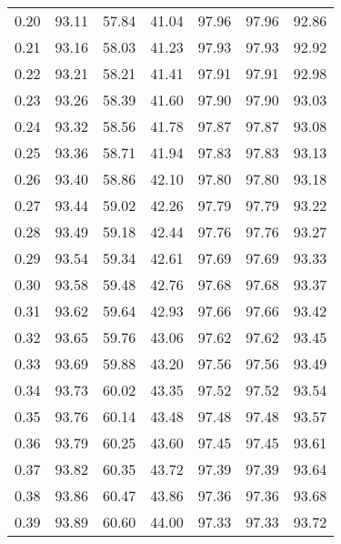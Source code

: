 \begin{tabular}{|c|c|c|c|c|c|c|}
      0.20 &     93.11 &     57.84 &      41.04 &   97.96 &      97.96 &         92.86 \\
      0.21 &     93.16 &     58.03 &      41.23 &   97.93 &      97.93 &         92.92 \\
      0.22 &     93.21 &     58.21 &      41.41 &   97.91 &      97.91 &         92.98 \\
      0.23 &     93.26 &     58.39 &      41.60 &   97.90 &      97.90 &         93.03 \\
      0.24 &     93.32 &     58.56 &      41.78 &   97.87 &      97.87 &         93.08 \\
      0.25 &     93.36 &     58.71 &      41.94 &   97.83 &      97.83 &         93.13 \\
      0.26 &     93.40 &     58.86 &      42.10 &   97.80 &      97.80 &         93.18 \\
      0.27 &     93.44 &     59.02 &      42.26 &   97.79 &      97.79 &         93.22 \\
      0.28 &     93.49 &     59.18 &      42.44 &   97.76 &      97.76 &         93.27 \\
      0.29 &     93.54 &     59.34 &      42.61 &   97.69 &      97.69 &         93.33 \\
      0.30 &     93.58 &     59.48 &      42.76 &   97.68 &      97.68 &         93.37 \\
      0.31 &     93.62 &     59.64 &      42.93 &   97.66 &      97.66 &         93.42 \\
      0.32 &     93.65 &     59.76 &      43.06 &   97.62 &      97.62 &         93.45 \\
      0.33 &     93.69 &     59.88 &      43.20 &   97.56 &      97.56 &         93.49 \\
      0.34 &     93.73 &     60.02 &      43.35 &   97.52 &      97.52 &         93.54 \\
      0.35 &     93.76 &     60.14 &      43.48 &   97.48 &      97.48 &         93.57 \\
      0.36 &     93.79 &     60.25 &      43.60 &   97.45 &      97.45 &         93.61 \\
      0.37 &     93.82 &     60.35 &      43.72 &   97.39 &      97.39 &         93.64 \\
      0.38 &     93.86 &     60.47 &      43.86 &   97.36 &      97.36 &         93.68 \\
      0.39 &     93.89 &     60.60 &      44.00 &   97.33 &      97.33 &         93.72 \\

\end{tabular}
